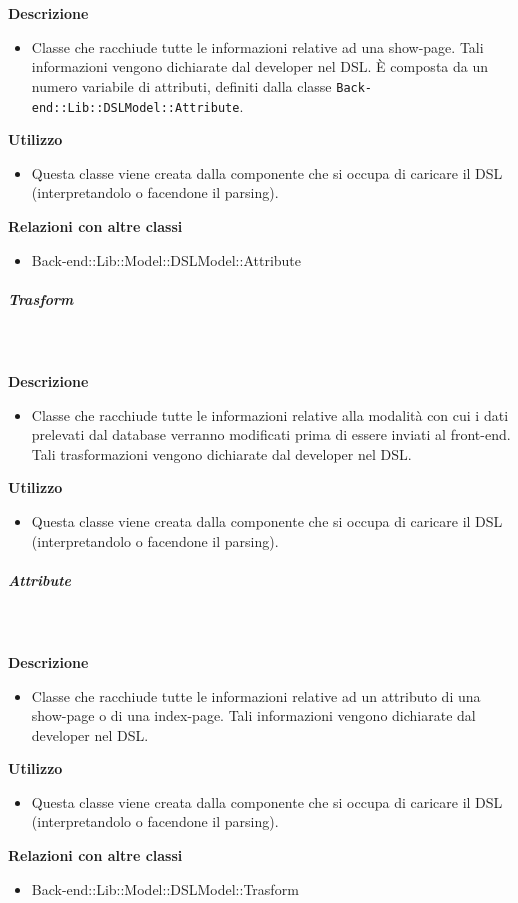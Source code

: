 				\textbf{\\ \\ Descrizione} 
					\begin{itemize}
						\item[] Classe che racchiude tutte le informazioni relative ad una show-page. Tali informazioni vengono dichiarate dal developer nel DSL. È composta da un numero variabile di attributi, definiti dalla classe \texttt{Back-end::Lib::DSLModel::Attribute}.
					\end{itemize}      
				\textbf{Utilizzo}  
					\begin{itemize}
						\item[] Questa classe viene creata dalla componente che si occupa di caricare il DSL (interpretandolo o facendone il parsing).
					\end{itemize}
					\textbf{Relazioni con altre classi}
					\begin{itemize}
							\item{Back-end::Lib::Model::DSLModel::Attribute}
					\end{itemize}
			\subparagraph{Trasform}
				
				\textbf{\\ \\ Descrizione} 
					\begin{itemize}
						\item[] Classe che racchiude tutte le informazioni relative alla modalità con cui i dati prelevati dal database verranno modificati prima di essere inviati al front-end.
Tali trasformazioni vengono dichiarate dal developer nel DSL.
					\end{itemize}      
				\textbf{Utilizzo}  
					\begin{itemize}
						\item[] Questa classe viene creata dalla componente che si occupa di caricare il DSL (interpretandolo o facendone il parsing).
					\end{itemize}
			\subparagraph{Attribute}
				
				\textbf{\\ \\ Descrizione} 
					\begin{itemize}
						\item[] Classe che racchiude tutte le informazioni relative ad un attributo di una show-page o di una index-page. Tali informazioni vengono dichiarate dal developer nel DSL.
					\end{itemize}      
				\textbf{Utilizzo}  
					\begin{itemize}
						\item[] Questa classe viene creata dalla componente che si occupa di caricare il DSL (interpretandolo o facendone il parsing).
					\end{itemize}
					\textbf{Relazioni con altre classi}
					\begin{itemize}
							\item{Back-end::Lib::Model::DSLModel::Trasform}
					\end{itemize}
